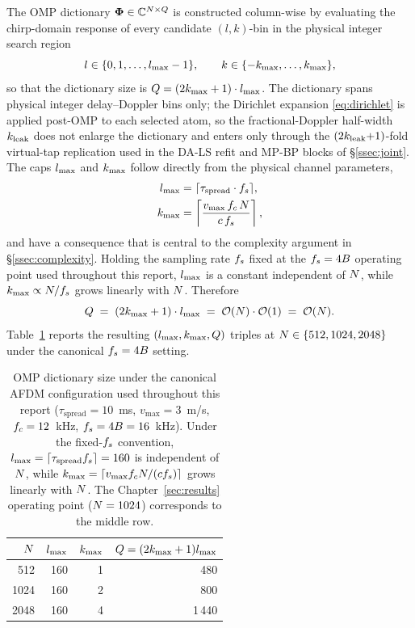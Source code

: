 The OMP dictionary $\boldsymbol{\Phi} \in \mathbb{C}^{N \times Q}$ is constructed column-wise by evaluating the chirp-domain response of every candidate $(l, k)$-bin in the physical integer search region
\begin{equation}
l \in \{0, 1, \dots, l_{\max} - 1\}, \qquad k \in \{-k_{\max}, \dots, k_{\max}\},
\end{equation}
so that the dictionary size is $Q = (2k_{\max} + 1) \cdot l_{\max}$. The dictionary spans physical integer delay--Doppler bins only; the Dirichlet expansion \eqref{eq:dirichlet} is applied post-OMP to each selected atom, so the fractional-Doppler half-width $k_{\mathrm{leak}}$ does not enlarge the dictionary and enters only through the $(2k_{\mathrm{leak}}{+}1)$-fold virtual-tap replication used in the DA-LS refit and MP-BP blocks of \S\ref{ssec:joint}. The caps $l_{\max}$ and $k_{\max}$ follow directly from the physical channel parameters,
\begin{align}
l_{\max} &= \lceil \tau_{\text{spread}} \cdot f_s \rceil, \label{eq:lmax} \\
k_{\max} &= \left\lceil \frac{v_{\max}\, f_c\, N}{c\, f_s} \right\rceil, \label{eq:kmax}
\end{align}
and have a consequence that is central to the complexity argument in \S\ref{ssec:complexity}. Holding the sampling rate $f_s$ fixed at the $f_s = 4B$ operating point used throughout this report, $l_{\max}$ is a constant independent of $N$, while $k_{\max} \propto N / f_s$ grows linearly with $N$. Therefore
\begin{equation}
Q \;=\; (2k_{\max} + 1) \cdot l_{\max} \;=\; \mathcal{O}(N) \cdot \mathcal{O}(1) \;=\; \mathcal{O}(N). \label{eq:Qlinear}
\end{equation}
Table~\ref{tab:dictsize} reports the resulting $(l_{\max}, k_{\max}, Q)$ triples at $N \in \{512, 1024, 2048\}$ under the canonical $f_s = 4B$ setting.

\begin{table}[t]
\centering
\caption{OMP dictionary size under the canonical AFDM configuration used throughout this report ($\tau_{\text{spread}} = 10$~ms, $v_{\max} = 3$~m/s, $f_c = 12$~kHz, $f_s = 4B = 16$~kHz). Under the fixed-$f_s$ convention, $l_{\max} = \lceil \tau_{\text{spread}} f_s \rceil = 160$ is independent of $N$, while $k_{\max} = \lceil v_{\max}f_cN/(cf_s)\rceil$ grows linearly with $N$. The Chapter~\ref{sec:results} operating point ($N = 1024$) corresponds to the middle row.}
\label{tab:dictsize}
\begin{tabular}{rrrr}
\toprule
$N$ & $l_{\max}$ & $k_{\max}$ & $Q = (2k_{\max}+1)l_{\max}$ \\
\midrule
512  & 160 & 1 & 480   \\
1024 & 160 & 2 & 800   \\
2048 & 160 & 4 & 1\,440 \\
\bottomrule
\end{tabular}
\end{table}


